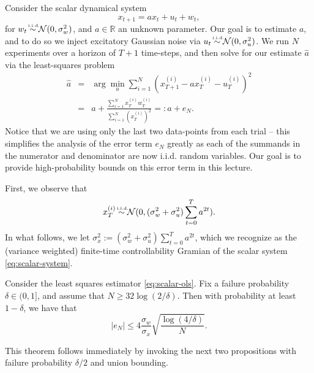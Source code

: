 \documentclass{article}[12pt]
\def\R{\mathbf{R}}
\def \R{\mathbb R}
\begin{document}
 Consider the scalar dynamical system
\begin{equation}
x_{t+1} = ax_t + u_t + w_t,
\label{eq:scalar-system}
\end{equation}
for $w_t\iid \Normal(0,\sigma_w^2)$, and $a\in \R$ an unknown parameter.
Our goal is to estimate $a$, and to do so we inject excitatory Gaussian noise via $u_t \iid \Normal (0,\sigma_u^2)$.  We run $N$ experiments over a horizon of $T+1$ time-steps, and then solve for our estimate $\hat{a}$ via the least-squares problem
\begin{equation}\begin{array}{rcl}
\hat{a} &=& \arg\min_a \sum_{i=1}^N (x_{T+1}^{(i)} - ax_{T}^{(i)}- u_T^{(i)})^2\\
&=& a + \frac{\sum_{i=1}^{N}x_T^{(i)} w_T^{(i)}}{\sum_{i=1}^{N} (x^{(i)}_T)^2} =: a + e_N.
\end{array}
\label{eq:scalar-ols}
\end{equation}
Notice that we are using only the last two data-points from each trial -- this simplifies the analysis of the error term $e_N$ greatly as each of the summands in the numerator and denominator are now i.i.d. random variables.  Our goal is to provide high-probability bounds on this error term in this lecture.
 
 
  First, we observe that
\begin{equation} 
 x_T^{(i)} \iid \Normal(0,(\sigma_w^2 + \sigma_u^2) \sum_{t=0}^T a^{2t}).
 \label{eq:scalar-iid-xT}
 \end{equation}
In what follows, we let $\sigma_x^2:= (\sigma_w^2 + \sigma_u^2) \sum_{t=0}^T a^{2t}$, which we recognize as the (variance weighted) finite-time controllability Gramian of the scalar system \eqref{eq:scalar-system}. 

\begin{theorem}
Consider the least squares estimator \eqref{eq:scalar-ols}.  Fix a failure probability $\delta \in (0,1]$, and assume that $N\geq 32 \log(2/\delta)$.  Then with probability at least $1-\delta$, we have that
\begin{equation}
|e_N| \leq 4\frac{\sigma_w}{\sigma_x}\sqrt{\frac{\log(4/\delta)}{N}}.
\end{equation}
\label{thm:iid-scalar-error}
\end{theorem}
 
 
 This theorem follows immediately by invoking the next two propositions with failure probability $\delta/2$ and union bounding.
\end{document}
